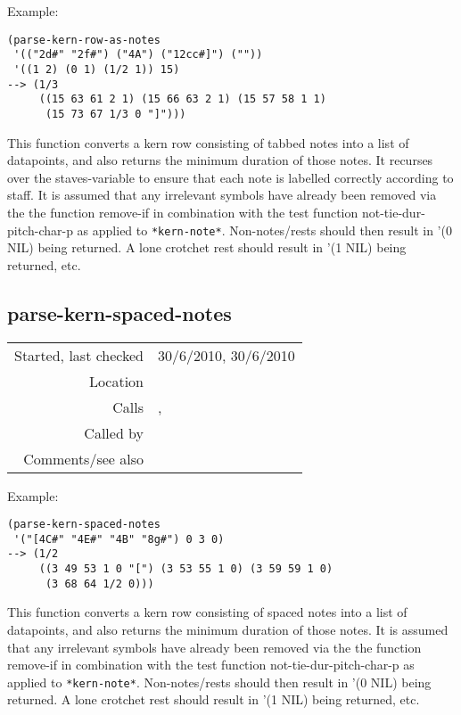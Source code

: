 \vspace{0.5cm}
\noindent Example:
\begin{verbatim}
(parse-kern-row-as-notes
 '(("2d#" "2f#") ("4A") ("12cc#]") (""))
 '((1 2) (0 1) (1/2 1)) 15)
--> (1/3
     ((15 63 61 2 1) (15 66 63 2 1) (15 57 58 1 1)
      (15 73 67 1/3 0 "]")))
\end{verbatim}

\noindent This function converts a kern row consisting
of tabbed notes into a list of datapoints, and also
returns the minimum duration of those notes. It
recurses over the staves-variable to ensure that each
note is labelled correctly according to staff. It is
assumed that any irrelevant symbols have already been
removed via the the function remove-if in combination
with the test function not-tie-dur-pitch-char-p as
applied to \texttt{*kern-note*}. Non-notes/rests
should then result in '(0 NIL) being returned. A lone
crotchet rest should result in '(1 NIL) being
returned, etc.


\subsection*{parse-kern-spaced-notes}\label{fun:parse-kern-spaced-notes}

\vspace{0.3cm}
\begin{tabular}{r|p{8cm}}
Started, last checked & 30/6/2010, 30/6/2010 \\
Location & \nameref{sec:kern} \\
Calls & \nameref{fun:kern-tie-dur-pitch2list},\newline \nameref{fun:pitch-and-octave2MIDI-morphetic-pair} \\
Called by & \nameref{fun:parse-kern-row-as-notes} \\
Comments/see also & \nameref{fun:parse-kern-spaced-rests}
\end{tabular}

\vspace{0.5cm}
\noindent Example:
\begin{verbatim}
(parse-kern-spaced-notes
 '("[4C#" "4E#" "4B" "8g#") 0 3 0)
--> (1/2
     ((3 49 53 1 0 "[") (3 53 55 1 0) (3 59 59 1 0)
      (3 68 64 1/2 0)))
\end{verbatim}

\noindent This function converts a kern row
consisting of spaced notes into a list of datapoints,
and also returns the minimum duration of those notes.
It is assumed that any irrelevant symbols have already
been removed via the the function remove-if in
combination with the test function
not-tie-dur-pitch-char-p as applied to
\texttt{*kern-note*}. Non-notes/rests should then
result in '(0 NIL) being returned. A lone crotchet
rest should result in '(1 NIL) being returned, etc.


